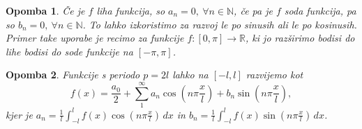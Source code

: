\documentclass[10pt, a4paper]{article}
\newtheorem*{opomba}{Opomba}
\newcommand{\N}{\mathbb {N}}
\newcommand{\R}{\mathbb {R}}
\begin{document}
\begin{opomba}
    Če je $f$ liha funkcija, so $a_n = 0,\ \forall n \in \N$, če pa je $f$ soda funkcija,
    pa so $b_n = 0,\ \forall n \in \N$. To lahko izkoristimo za razvoj le po sinusih ali le po kosinusih.
    Primer take uporabe je recimo za funkcije $f: [0, \pi] \to \R$, ki jo razširimo bodisi do lihe bodisi do sode funkcije na $[-\pi, \pi]$.
\end{opomba}

\begin{opomba}
    Funkcije s periodo $p = 2l$ lahko na $[-l, l]$ razvijemo kot 
    $$f(x) = \frac{a_0}{2} + \sum_1 ^\infty a_n \cos \left(n \pi \frac{x}{l}\right) + b_n \sin \left(n \pi \frac{x}{l}\right),$$
    kjer je $a_n = \frac{1}{l} \int_{-l} ^l f(x) \cos \left(n \pi \frac{x}{l}\right) \, dx$ in 
    $b_n = \frac{1}{l} \int_{-l} ^l f(x) \sin \left(n \pi \frac{x}{l}\right) \, dx$.
\end{opomba}
\end{document}
